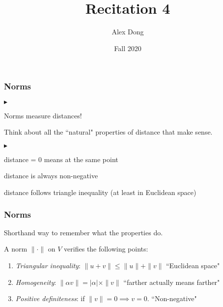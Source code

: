 \documentclass{beamer}
\title{Recitation 4}
\author{Alex Dong}
\institute{CDS, NYU}
\date{Fall 2020}
\renewenvironment{itemize}
\renewenvironment{enumerate}%
{\begin{list}{\arabic{enumi}.}%
      {\setlength{\leftmargin}{2.5em}%
       \setlength{\itemsep}{-\parsep}%
       \setlength{\topsep}{-\parskip}%
       \usecounter{enumi}}%
 }{\end{list}}
\renewenvironment{itemize}%
{\begin{list}{$\blacktriangleright$}%
      {\setlength{\leftmargin}{2.5em}%
       \setlength{\itemsep}{-\parsep}%
       \setlength{\topsep}{-\parskip}%
       \usecounter{enumi}}%
 }{\end{list}}
\begin{document}
\frame{\titlepage} 

\begin{frame}
\frametitle{Norms}
\begin{itemize}
\item Norms measure distances!
\item Think about all the ``natural" properties of distance that make sense.
\begin{itemize}
\item distance = 0 means at the same point
\item distance is always non-negative
\item distance follows triangle inequality (at least in Euclidean space)
\end{itemize}
\end{itemize}

\end{frame}

\begin{frame}
\frametitle{Norms}
Shorthand way to remember what the properties do.
\begin{definition}[Norm]
	A norm $\| \cdot \|$ on $V$ verifies the following points:
	\begin{enumerate}
		\item \emph{Triangular inequality}: $\|u + v\| \leq \|u\| + \|v\|$ \hfill ``Euclidean space"
		\item \emph{Homogeneity}: $\| \alpha v \| = |\alpha|\times \| v\|$ \hfill ``farther actually means farther"
		\item \emph{Positive definiteness}: if $\|v\| = 0 \implies v=0$. \hfill ``Non-negative"
	\end{enumerate}
\end{definition}
\end{frame}
\end{document}
